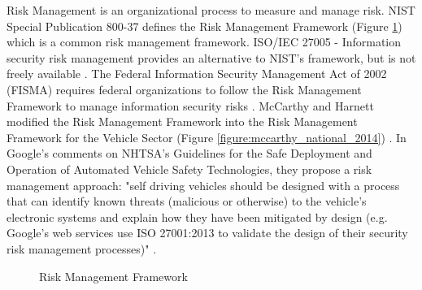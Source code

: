 \documentclass{article}
\begin{document}
\noindent \gls{Risk Management} is an organizational process to measure and manage risk. NIST Special Publication 800-37 defines the \gls{Risk Management Framework} (Figure \ref{figure:national_institute_of_standards_and_technology_nist_2017}) which is a common risk management framework. ISO/IEC 27005 - Information security risk management provides an alternative to NIST's framework, but is not freely available \citep{international_organization_for_standardization_iso/iec_2018}. The Federal Information Security Management Act of 2002 (FISMA) requires federal organizations to follow the Risk Management Framework to manage information security risks \citep{davis_iii_federal_2002}. McCarthy and Harnett modified the Risk Management Framework into the Risk Management Framework for the Vehicle Sector (Figure \ref{figure:mccarthy_national_2014}) \citep{mccarthy_national_2014}. In Google's comments on NHTSA's Guidelines for the Safe Deployment and Operation of Automated Vehicle Safety Technologies, they propose a risk management approach: "self driving vehicles should be designed with a process that can identify known threats (malicious or otherwise) to the vehicle's electronic systems and explain how they have been mitigated by design (e.g. Google's web services use ISO 27001:2013 to validate the design of their security risk management processes)" \citep{national_highway_traffic_safety_administration_guidelines_2016}. \\

\begin{figure}[h] \centering
{}
    \caption{Risk Management Framework \citep[Page 8]{national_institute_of_standards_and_technology_nist_2017}}
\label{figure:national_institute_of_standards_and_technology_nist_2017}
\end{figure}
\end{document}
